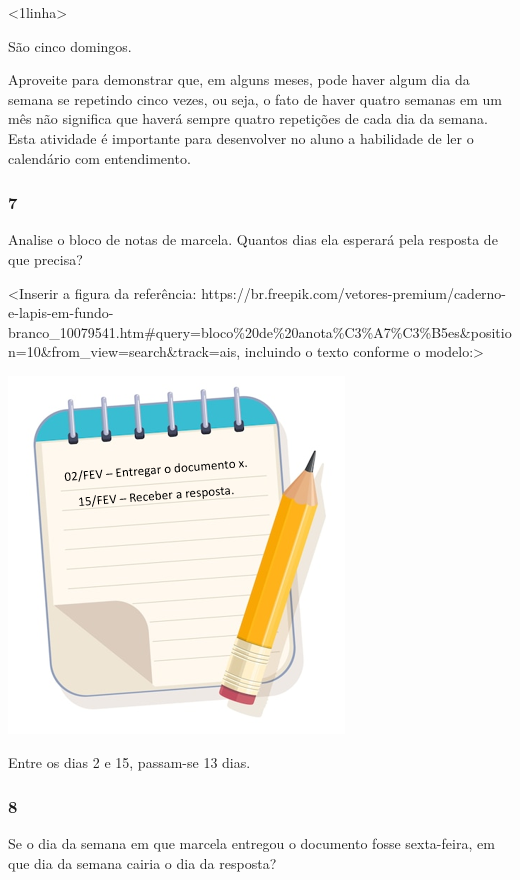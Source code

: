 \textless{}1linha\textgreater{}

São cinco domingos.

Aproveite para demonstrar que, em alguns meses,
pode haver algum dia da semana se repetindo cinco vezes, ou seja, o fato de
haver quatro semanas em um mês não significa que haverá sempre quatro repetições
de cada dia da semana. Esta atividade é importante para desenvolver no
aluno a habilidade de ler o calendário com entendimento.

\subsubsection{7}\label{section-45}

Analise o bloco de notas de marcela. Quantos dias ela esperará
pela resposta de que precisa?

\textless{}Inserir a figura da referência:
https://br.freepik.com/vetores-premium/caderno-e-lapis-em-fundo-branco\_10079541.htm\#query=bloco\%20de\%20anota\%C3\%A7\%C3\%B5es\&position=10\&from\_view=search\&track=ais,
incluindo o texto conforme o modelo:\textgreater{}

\includegraphics[width=3.51091in,height=3.72969in]{media/image37.png}

Entre os dias 2 e 15, passam-se 13 dias.

\subsubsection{8}\label{section-46}

Se o dia da semana em que marcela entregou o documento fosse
sexta-feira, em que dia da semana cairia o dia da resposta?

